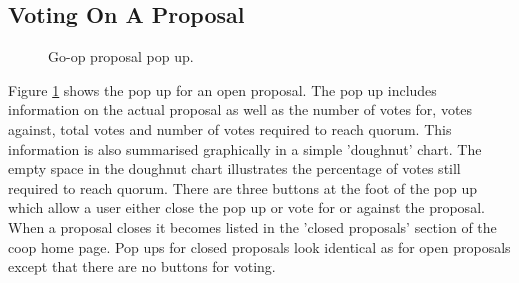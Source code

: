 \subsection{Voting On A Proposal}
\begin{figure}
\centering
{}
\decoRule
\caption[Go-op Proposal Pop Up]{Go-op proposal pop up.}
\label{fig:proposalvote}
\end{figure}

Figure \ref{fig:proposalvote} shows the pop up for an open proposal. The pop up includes information on the actual proposal as well as the number of votes for, votes against, total votes and number of votes required to reach quorum. This information is also summarised graphically in a simple 'doughnut' chart. The empty space in the doughnut chart illustrates the percentage of votes still required to reach quorum. There are three buttons at the foot of the pop up which allow a user either close the pop up or vote for or against the proposal.\\

When a proposal closes it becomes listed in the 'closed proposals' section of the coop home page. Pop ups for closed proposals look identical as for open proposals except that there are no buttons for voting.\\

